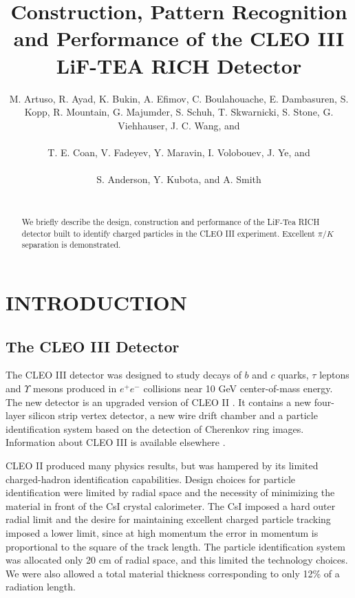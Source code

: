 \documentclass[fleqn,twoside]{article}
\title{Construction, Pattern Recognition and Performance of the CLEO III LiF-TEA RICH Detector}
\author{M. Artuso, R. Ayad, K. Bukin, A. Efimov, C. Boulahouache,
E. Dambasuren, S. Kopp, R. Mountain, G. Majumder, S. Schuh,
T. Skwarnicki, S. Stone, G. Viehhauser, J. C. Wang, and
\address{Syracuse University,  Syracuse, NY 13244-1130, U. S. A.}\\
T. E. Coan, V. Fadeyev, Y. Maravin, I. Volobouev, J. Ye, and
\address{Southern Methodist University, Dallas, TX 75275-0175}\\
S. Anderson, Y. Kubota, and A. Smith
\address{University of Minnesota, Minneapolis, MN 55455-0112}\\}
\begin{document}
\begin{abstract}

We briefly describe the design, construction and performance of
the LiF-Tea RICH detector built to identify charged particles in
the CLEO III experiment. Excellent $\pi/K$ separation is
demonstrated.

\vspace{1pc}

\end{abstract}




\maketitle



\section{INTRODUCTION}

\subsection{The CLEO III Detector}

The CLEO III detector was designed to study decays of $b$ and $c$ quarks,
$\tau$ leptons and $\Upsilon$ mesons produced in $e^+e^-$ collisions
near 10 GeV center-of-mass energy. The new detector is an upgraded
version of CLEO II \cite{CLEOII}. It contains a new four-layer silicon strip
vertex detector, a new wire drift chamber and a particle identification system
based on the detection of Cherenkov ring images. Information about CLEO III
is available elsewhere \cite{Artu98,Kopp96}.

CLEO II produced many physics results, but was hampered by its limited
charged-hadron identification capabilities.
Design choices for particle identification were
limited by radial space and the necessity of minimizing the material in front
of the CsI crystal calorimeter. The CsI imposed a hard outer radial limit and the
desire for maintaining excellent charged particle tracking imposed a
lower limit, since at high momentum the error in momentum is
proportional to the square of the track length. The particle identification
system was allocated only 20 cm of radial space, and this limited the
technology choices. We were also allowed a total material thickness corresponding to only 12\% of a radiation length.
\end{document}
